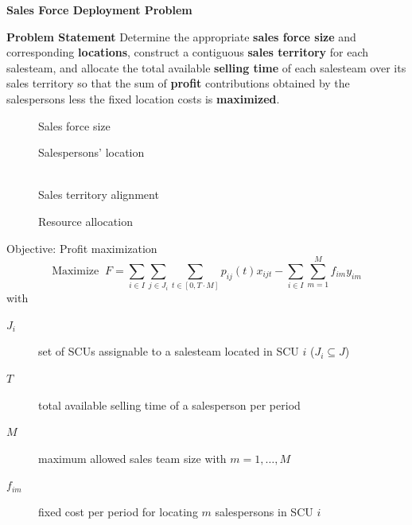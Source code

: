 \begin{frame}{\textbf{Sales Force Deployment Problem}}
\begin{block}{\textbf{Problem Statement}}
Determine the appropriate \textbf{sales force size} and corresponding \textbf{locations}, construct a
contiguous \textbf{sales territory} for each salesteam, and allocate the total available
\textbf{selling time} of each salesteam over its sales territory so that the sum of \textbf{profit}
contributions obtained by the salespersons less the fixed location costs is \textbf{maximized}.
\end{block}
\begin{figure}
\centering
 \begin{minipage}[b]{0.2\linewidth} \centering
  
	\footnotesize Sales force size 
 \end{minipage}
 \begin{minipage}[b]{0.2\linewidth} \centering
	
	\footnotesize Salespersons' location
	\end{minipage}
	\begin{minipage}[b]{0.25\linewidth} \centering
	\\
	\footnotesize Sales territory alignment
	\end{minipage}
	\begin{minipage}[b]{0.2\linewidth} \centering
	
	\footnotesize Resource allocation
	\end{minipage}
\end{figure}
\end{frame}

\begin{frame}{Objective: Profit maximization}
\begin{equation}
 \text{Maximize } \ F =  \sum_{i \in I} \sum_{j \in J_i} \sum_{t \in [0,T \cdot M]} p_{ij}(t)  x_{ijt} - \sum_{i \in I} \sum_{m=1}^M f_{im} y_{im}  \label{sfd-mod-of}
\end{equation}
with\\
\begin{description}
	\item[$J_i$]     set of SCUs assignable to a salesteam located in SCU $i$ ($J_i \subseteq J$)
  \item[$T$]       total available selling time of a salesperson per period
    \item[$M$] maximum allowed sales team size with $m = 1,\dots,M$
  \item[$f_{im}$]   fixed cost per period for locating $m$ salespersons in SCU $i$
\end{description}
\end{frame}


